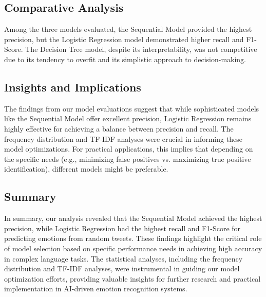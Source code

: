 \subsection{Comparative Analysis}
Among the three models evaluated, the Sequential Model provided the highest precision, but the Logistic Regression model demonstrated higher recall and F1-Score. The Decision Tree model, despite its interpretability, was not competitive due to its tendency to overfit and its simplistic approach to decision-making.

\subsection{Insights and Implications}
The findings from our model evaluations suggest that while sophisticated models like the Sequential Model offer excellent precision, Logistic Regression remains highly effective for achieving a balance between precision and recall. The frequency distribution and TF-IDF analyses were crucial in informing these model optimizations. For practical applications, this implies that depending on the specific needs (e.g., minimizing false positives vs. maximizing true positive identification), different models might be preferable.


\subsection{Summary}
In summary, our analysis revealed that the Sequential Model achieved the highest precision, while Logistic Regression had the highest recall and F1-Score for predicting emotions from random tweets. These findings highlight the critical role of model selection based on specific performance needs in achieving high accuracy in complex language tasks. The statistical analyses, including the frequency distribution and TF-IDF analyses, were instrumental in guiding our model optimization efforts, providing valuable insights for further research and practical implementation in AI-driven emotion recognition systems.
